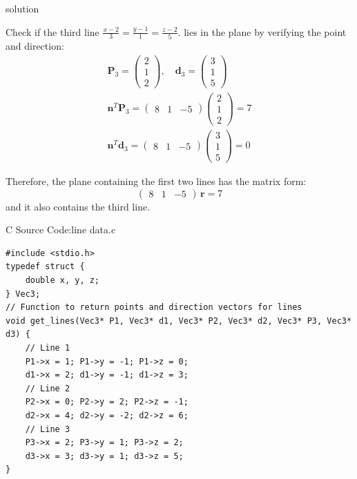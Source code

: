 \documentclass{beamer}
\numberwithin{equation}{section}
\theoremstyle{remark}
\newcommand{\myvec}[1]{\ensuremath{\begin{pmatrix}#1\end{pmatrix}}}
\let\vec\mathbf
\begin{document}
\begin{frame}{solution}

\noindent Check if the third line $\frac{x-2}{3} = \frac{y-1}{1} = \frac{z-2}{5}$. lies in the plane by verifying the point and direction:
\begin{align}
\vec{P}_3 = \myvec{2\\1\\2}, \quad \vec{d}_3 = \myvec{3\\1\\5} \\
\vec{n}^T \vec{P}_3 = \myvec{8 & 1 & -5}\myvec{2\\1\\2} = 7 \\
\vec{n}^T \vec{d}_3 = \myvec{8 & 1 & -5}\myvec{3\\1\\5} = 0
\end{align}

\noindent Therefore, the plane containing the first two lines has the matrix form:
\[
\myvec{8 & 1 & -5}\,\vec{r} = 7
\]  
and it also contains the third line.
\end{frame}



\begin{frame}[fragile]{C Source Code:line data.c}
\begin{verbatim}
#include <stdio.h>
typedef struct {
    double x, y, z;
} Vec3;
// Function to return points and direction vectors for lines
void get_lines(Vec3* P1, Vec3* d1, Vec3* P2, Vec3* d2, Vec3* P3, Vec3* d3) {
    // Line 1
    P1->x = 1; P1->y = -1; P1->z = 0;
    d1->x = 2; d1->y = -1; d1->z = 3;
    // Line 2
    P2->x = 0; P2->y = 2; P2->z = -1;
    d2->x = 4; d2->y = -2; d2->z = 6;
    // Line 3
    P3->x = 2; P3->y = 1; P3->z = 2;
    d3->x = 3; d3->y = 1; d3->z = 5;
}
\end{verbatim}
\end{frame}
\end{document}
